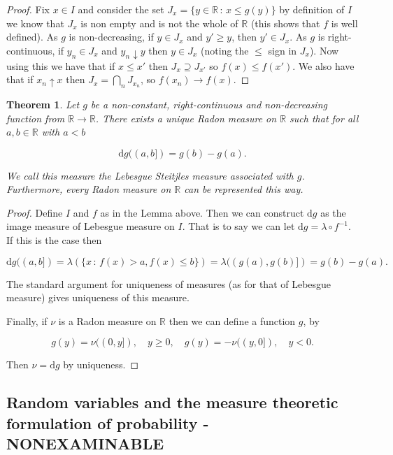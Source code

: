 \documentclass[
]{book}
\newtheorem{theorem}{Theorem}[chapter]
\theoremstyle{definition}
\theoremstyle{definition}
\theoremstyle{definition}
\theoremstyle{definition}
\theoremstyle{remark}
\begin{document}
\begin{proof}
Fix \(x \in I\) and consider the set \(J_x = \{ y \in \mathbb{R}\,:\, x \leq g(y)\}\) by definition of \(I\) we know that \(J_x\) is non empty and is not the whole of \(\mathbb{R}\) (this shows that \(f\) is well defined). As \(g\) is non-decreasing, if \(y \in J_x\) and \(y' \geq y\), then \(y' \in J_x\). As \(g\) is right-continuous, if \(y_n \in J_x\) and \(y_n \downarrow y\) then \(y \in J_x\) (noting the \(\leq\) sign in \(J_x\)). Now using this we have that if \(x \leq x'\) then \(J_x \supseteq J_{x'}\) so \(f(x) \leq f(x')\). We also have that if \(x_n \uparrow x\) then \(J_x = \bigcap_n J_{x_n}\), so \(f(x_n) \rightarrow f(x)\).
\end{proof}

\begin{theorem}
Let \(g\) be a non-constant, right-continuous and non-decreasing function from \(\mathbb{R} \rightarrow \mathbb{R}\). There exists a unique Radon measure on \(\mathbb{R}\) such that for all \(a,b \in \mathbb{R}\) with \(a < b\)

\[ \mathrm{d}g((a,b]) = g(b) - g(a). \]

We call this measure the \emph{Lebesgue Steitjles} measure associated with \(g\). Furthermore, every Radon measure on \(\mathbb{R}\) can be represented this way.
\end{theorem}

\begin{proof}
Define \(I\) and \(f\) as in the Lemma above. Then we can construct \(\mathrm{d}g\) as the image measure of Lebesgue measure on \(I\). That is to say we can let \(\mathrm{d}g = \lambda \circ f^{-1}\). If this is the case then

\[ \mathrm{d}g ((a,b]) = \lambda \left(\{ x \, :\, f(x) > a, f(x) \leq b \} \right) = \lambda ((g(a), g(b)]) = g(b) - g(a). \]

The standard argument for uniqueness of measures (as for that of Lebesgue measure) gives uniqueness of this measure.

Finally, if \(\nu\) is a Radon measure on \(\mathbb{R}\) then we can define a function \(g\), by

\[ g(y) = \nu((0,y]), \quad y \geq 0, \quad g(y) = -\nu((y,0]), \quad y<0. \]

Then \(\nu = \mathrm{d}g\) by uniqueness.
\end{proof}

\hypertarget{random-variables-and-the-measure-theoretic-formulation-of-probability---nonexaminable}{%
\subsection{Random variables and the measure theoretic formulation of probability - NONEXAMINABLE}\label{random-variables-and-the-measure-theoretic-formulation-of-probability---nonexaminable}}
\end{document}
